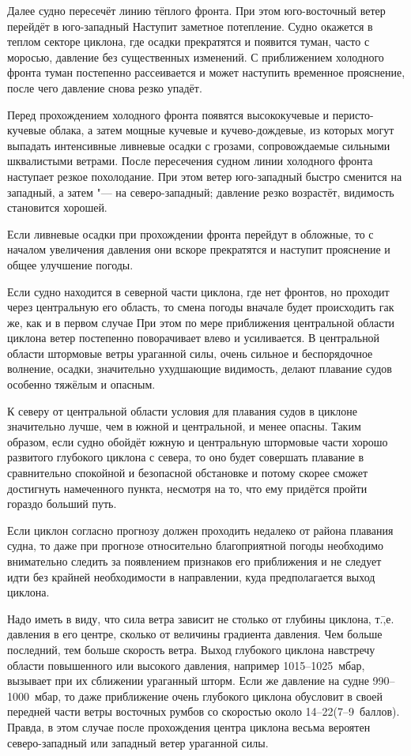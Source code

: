 Далее судно пересечёт линию тёплого фронта. При этом юго-восточный
ветер перейдёт в юго-западный Наступит заметное потепление. Судно
окажется в теплом секторе циклона, где осадки прекратятся и появится
туман, часто с моросью, давление без существенных изменений. С
приближением холодного фронта туман постепенно рассеивается и может
наступить временное прояснение, после чего давление снова резко
упадёт.

Перед прохождением холодного фронта появятся высококучевые и
перисто-кучевые облака, а затем мощные кучевые и кучево-дождевые, из
которых могут выпадать интенсивные ливневые осадки с грозами,
сопровождаемые сильными шквалистыми ветрами. После пересечения судном
линии холодного фронта наступает резкое похолодание. При этом ветер
юго-западный быстро сменится на западный, а затем "--- на
северо-западный; давление резко возрастёт, видимость становится
хорошей.

Если ливневые осадки при прохождении фронта перейдут в обложные, то с
началом увеличения давления они вскоре прекратятся и наступит
прояснение и общее улучшение погоды.

Если судно находится в северной части циклона, где нет фронтов, но
проходит через центральную его область, то смена погоды вначале будет
происходить гак же, как и в первом случае При этом по мере приближения
центральной области циклона ветер постепенно поворачивает влево и
усиливается. В центральной области штормовые ветры ураганной силы,
очень сильное и беспорядочное волнение, осадки, значительно ухудшающие
видимость, делают плавание судов особенно тяжёлым и опасным.

К северу от центральной области условия для плавания судов в циклоне
значительно лучше, чем в южной и центральной, и менее опасны. Таким
образом, если судно обойдёт южную и центральную штормовые части хорошо
развитого глубокого циклона с севера, то оно будет совершать плавание
в сравнительно спокойной и безопасной обстановке и потому скорее
сможет достигнуть намеченного пункта, несмотря на то, что ему придётся
пройти гораздо больший путь.

Если циклон согласно прогнозу должен проходить недалеко от района
плавания судна, то даже при прогнозе относительно благоприятной погоды
необходимо внимательно следить за появлением признаков его приближения
и не следует идти без крайней необходимости в направлении, куда
предполагается выход циклона.

Надо иметь в виду, что сила ветра зависит не столько от глубины
циклона, т.\=,е. давления в его центре, сколько от величины градиента
давления. Чем больше последний, тем больше скорость ветра. Выход
глубокого циклона навстречу области повышенного или высокого давления,
например 1015--1025~мбар, вызывает при их сближении ураганный
шторм. Если же давление на судне 990--1000~мбар, то даже приближение
очень глубокого циклона обусловит в своей передней части ветры
восточных румбов со скоростью около 14--22\speedms (7--9~баллов). Правда,
в этом случае после прохождения центра циклона весьма вероятен
северо-западный или западный ветер ураганной силы.

